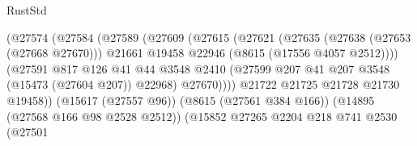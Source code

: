 \begin{lexlean}{RustStd}
\begin{coremodule}
                                            (@27574
                                              (@27584
                                                (@27589
                                                  (@27609
                                                    (@27615
                                                      (@27621
                                                        (@27635
                                                          (@27638 (@27653 (@27668 @27670)))
                                                          @21661
                                                          @19458
                                                          @22946
                                                          (@8615 (@17556 @4057 @2512))))
                                                      (@27591
                                                        @817
                                                        @126
                                                        @41
                                                        @44
                                                        @3548
                                                        @2410
                                                        (@27599
                                                          @207
                                                          @41
                                                          @207
                                                          @3548
                                                          (@15473 (@27604 @207))
                                                          @22968)
                                                        @27670))))
                                                @21722
                                                @21725
                                                @21728
                                                @21730
                                                @19458))
                                            (@15617 (@27557 @96))
                                            (@8615 (@27561 @384 @166))
                                            (@14895 (@27568 @166 @98 @2528 @2512))
                                            (@15852
                                              @27265
                                              @2204
                                              @218
                                              @741
                                              @2530
                                              (@27501

\end{coremodule}
\end{lexlean}

